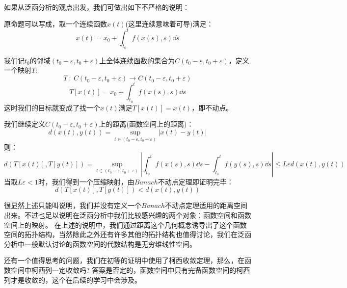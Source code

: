 如果从泛函分析的观点出发，我们可做出如下不严格的说明：

原命题可以写成，取一个连续函数$x(t)$(这里连续意味着可导)满足：
\[x(t)=x_0+\int_{t_0}^tf(x(s),s)\dd s\]

我们记$t_0$的邻域$(t_0-\varepsilon,t_0+\varepsilon)$上全体连续函数的集合为$C(t_0-\varepsilon,t_0+\varepsilon)$，定义一个映射$T$:
\[T \ : \ C(t_0-\varepsilon,t_0+\varepsilon) \rightarrow C(t_0-\varepsilon,t_0+\varepsilon)\]
\[T[x(t)]=x_0+\int_{t_0}^tf(x(s),s)\dd s\]
这时我们的目标就变成了找一个$x(t)$满足$T[x(t)]=x(t)$，即不动点。

我们继续定义$C(t_0-\varepsilon,t_0+\varepsilon)$上的距离(函数空间上的距离)：
\[d(x(t),y(t))={\mathop {\text{sup}}\limits_{t \in (t_0-\varepsilon,t_0+\varepsilon)}} |x(t)-y(t)|\]
则：
\[d(T[x(t)],T[y(t)])={\mathop {\text{sup}}\limits_{t \in (t_0-\varepsilon,t_0+\varepsilon)}} \left|\int_{t_0}^tf(x(s),s)\dd s-\int_{t_0}^tf(y(s),s)\dd s \right| \leq L\varepsilon d(x(t),y(t))\]
当取$L\varepsilon < 1$时，我们得到一个压缩映射，由$Banach$不动点定理即证明完毕：
\[d(T[x(t)],T[y(t)]) < d(x(t),y(t))\]

很显然上述只能叫说明，我们并没有定义一个$Banach$不动点定理适用的距离空间出来。不过也足以说明在泛函分析中我们比较感兴趣的两个对象：函数空间和函数空间上的映射。
在上述的说明中，我们通过距离这个几何概念诱导出了这个函数空间的拓扑结构，当然除此之外还有许多其他的拓扑结构也值得讨论，我们在泛函分析中一般默认讨论的函数空间的代数结构是无穷维线性空间。

还有一个值得思考的问题，我们在初等的证明中使用了柯西收敛定理，那么，在函数空间中柯西列一定收敛吗?
答案是否定的，函数空间中只有完备函数空间的柯西列才是收敛的，这个在后续的学习中会涉及。